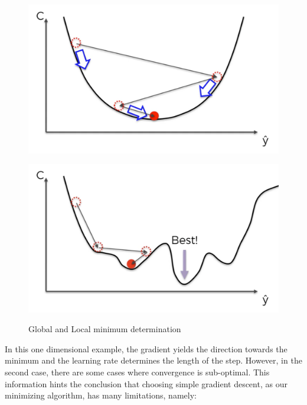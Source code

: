 \begin{figure}[H]
	\centering
	\begin{minipage}{.5\textwidth}
		\centering
		\includegraphics[width=.9\linewidth]{figures/graddesc.png}
		\label{fig:test1}
	\end{minipage}%
	\begin{minipage}{.5\textwidth}
		\centering
		\includegraphics[width=.9\linewidth]{figures/graddesc2.png}
		\label{fig:test2}
	\end{minipage}
	\caption{Global and Local minimum determination \cite{udemyDS}}
\end{figure}

In this one dimensional example, the gradient yields the direction towards the minimum and the learning rate determines the length of the step. However, in the second case, there are some cases where convergence is sub-optimal. This information hints the conclusion that choosing simple gradient descent, as our minimizing algorithm, has many limitations, namely:

